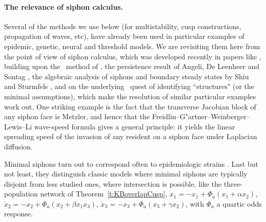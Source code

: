 \paragraph{The relevance of siphon calculus.}
Several of the methods we use below (for multistability, cusp constructions, propagation of waves,  etc), have already been used  in particular examples of epidemic, genetic,
 neural and threshold models. We are revisiting them here from the point of view  of siphon calculus, which was developed recently in papers like \cite{AAHK,AAHRah,AAHrel,AA26}, building upon the \NGM\ method of \cite{Van},  the persistence result of Angeli, De Leenheer
and Sontag \cite{AdLS},  the algebraic analysis
of siphons and boundary steady states by Shiu and Sturmfels
\cite{ShiuStu}, and on the underlying \CRN\ quest of identifying ``structures" (or the minimal assumptions), which make  the resolution of similar  particular examples work out.  One striking example is the fact that the transverse Jacobian block of any siphon face is Metzler, and hence that the Freidlin--G"artner--Weinberger--Lewis--Li wave-speed formula gives a general principle: it yields the linear spreading speed of the invasion of any resident on a siphon face under Laplacian diffusion.

Minimal siphons turn out to correspond often to epidemiologic strains \cite{AABH25}. Last but not least, they distinguish classic models where minimal siphons are typically disjoint from less studied ones, where intersection is possible, like  the
three-population  network of Theorem~\ref{t:KBoverlapCusp},
$\dot x_1=-x_1+\Phi_a(x_1+\alpha x_2)$, $\dot x_2=-x_2+\Phi_a(x_2+\beta x_1x_3)$,
$\dot x_3=-x_3+\Phi_a(x_3+\gamma x_2)$, with $\Phi_a$ a quartic odds response.%




